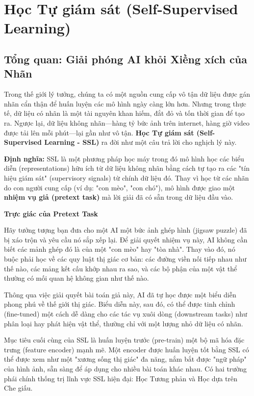 \section{Học Tự giám sát (Self-Supervised Learning)}
\label{sec:self_supervised_learning}

\subsection{Tổng quan: Giải phóng AI khỏi Xiềng xích của Nhãn}
\label{subsec:ssl_overview}
Trong thế giới lý tưởng, chúng ta có một nguồn cung cấp vô tận dữ liệu được gán nhãn cẩn thận để huấn luyện các mô hình ngày càng lớn hơn. Nhưng trong thực tế, dữ liệu có nhãn là một tài nguyên khan hiếm, đắt đỏ và tốn thời gian để tạo ra. Ngược lại, dữ liệu không nhãn—hàng tỷ bức ảnh trên internet, hàng giờ video được tải lên mỗi phút—lại gần như vô tận. \textbf{Học Tự giám sát (Self-Supervised Learning - SSL)} ra đời như một câu trả lời cho nghịch lý này.

\textbf{Định nghĩa:} SSL là một phương pháp học máy trong đó mô hình học các biểu diễn (representations) hữu ích từ dữ liệu không nhãn bằng cách tự tạo ra các "tín hiệu giám sát" (supervisory signals) từ chính dữ liệu đó. Thay vì học từ các nhãn do con người cung cấp (ví dụ: "con mèo", "con chó"), mô hình được giao một \textbf{nhiệm vụ giả (pretext task)} mà lời giải đã có sẵn trong dữ liệu đầu vào.

\begin{mdframed}[style=infobox]
	\textbf{Trực giác của Pretext Task}
	
	Hãy tưởng tượng bạn đưa cho một AI một bức ảnh ghép hình (jigsaw puzzle) đã bị xáo trộn và yêu cầu nó sắp xếp lại. Để giải quyết nhiệm vụ này, AI không cần biết các mảnh ghép đó là của một "con mèo" hay "tòa nhà". Thay vào đó, nó buộc phải học về các quy luật thị giác cơ bản: các đường viền nối tiếp nhau như thế nào, các mảng kết cấu khớp nhau ra sao, và các bộ phận của một vật thể thường có mối quan hệ không gian như thế nào.
	
	Thông qua việc giải quyết bài toán giả này, AI đã tự học được một biểu diễn phong phú về thế giới thị giác. Biểu diễn này, sau đó, có thể được tinh chỉnh (fine-tuned) một cách dễ dàng cho các tác vụ xuôi dòng (downstream tasks) như phân loại hay phát hiện vật thể, thường chỉ với một lượng nhỏ dữ liệu có nhãn.
\end{mdframed}

Mục tiêu cuối cùng của SSL là huấn luyện trước (pre-train) một bộ mã hóa đặc trưng (feature encoder) mạnh mẽ. Một encoder được huấn luyện tốt bằng SSL có thể được xem như một "xương sống thị giác" đa năng, nắm bắt được "ngữ pháp" của hình ảnh, sẵn sàng để áp dụng cho nhiều bài toán khác nhau. Có hai trường phái chính thống trị lĩnh vực SSL hiện đại: Học Tương phản và Học dựa trên Che giấu.

